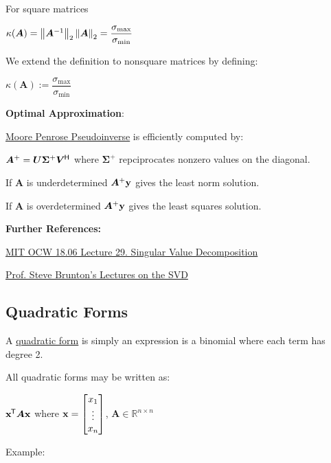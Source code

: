 \documentclass[11pt]{article}
\begin{document}
  For square matrices

  \(\kappa(\bm{A}) = \left\lVert\bm{A}^{-1}\right\rVert_2 \left\lVert\bm{A}\right\rVert_2 = \dfrac{\sigma_{\textrm{max}}}{\sigma_{\textrm{min}}}\)

  We extend the definition to nonsquare matrices by defining:

  \(\kappa(\bm{A}) := \dfrac{\sigma_{\textrm{max}}}{\sigma_{\textrm{min}}}\)

  \textbf{Optimal Approximation}:

  \href{https://www.wikiwand.com/en/Moore-Penrose_inverse}{Moore Penrose Pseudoinverse} is efficiently
  computed by:

  \(\bm{A}^+ = \bm{U} \bm{\Sigma}^+ \bm{V}^{\mkern-1.5mu\mathsf{H}}\)
  where \(\bm{\Sigma}^+\) repciprocates nonzero values on the diagonal.

  If \(\bm{A}\) is underdetermined \(\bm{A}^+\mathbf{y}\) gives the least norm solution.

  If \(\bm{A}\) is overdetermined \(\bm{A}^+\mathbf{y}\) gives the least squares solution.

  \textbf{Further References:}

  \href{https://www.youtube.com/watch?v=TX_vooSnhm8}{MIT OCW 18.06 Lecture 29. Singular Value Decomposition}

  \href{https://www.youtube.com/watch?v=gXbThCXjZFM&list=PLMrJAkhIeNNSVjnsviglFoY2nXildDCcv}
  {Prof. Steve Brunton's Lectures on the SVD}

  \pagebreak

  \subsection{Quadratic Forms}

  A \href{https://www.wikiwand.com/en/Quadratic_form}{quadratic form} is simply an expression is a
  binomial where each term has degree 2.

  \vspace{12pt}

  All quadratic forms may be written as:

  \(\mathbf{x}^{\mkern-1.5mu\mathsf{T}} \bm{A} \mathbf{x}\) where
  \(\mathbf{x} = \begin{bmatrix} x_1 \\ \vdots \\ x_n \end{bmatrix}\), \(\bm{A} \in \mathbb{R}^{n \times n}\)

  \vspace{12pt}

  Example:
\end{document}

